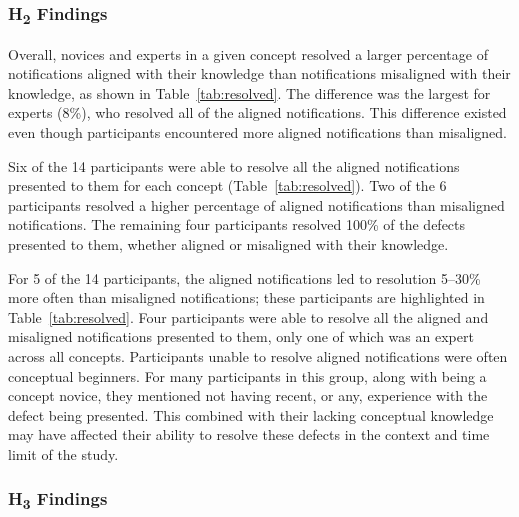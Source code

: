 \subsubsection*{H\textsubscript{2} Findings}

Overall, novices and experts in a given concept resolved a larger percentage of notifications aligned with their knowledge than notifications misaligned with their knowledge, as shown in Table~\ref{tab:resolved}.
The difference was the largest for experts (8\%), who resolved all of the aligned notifications.
This difference existed even though participants encountered more aligned notifications than misaligned.

Six of the 14 participants were able to resolve all the aligned notifications presented to them for each concept (Table~\ref{tab:resolved}). 
Two of the 6 participants resolved a higher percentage of aligned notifications than misaligned notifications.
The remaining four participants resolved 100\% of the defects presented to them, whether aligned or misaligned with their knowledge.

For 5 of the 14 participants, the aligned notifications led to resolution 5--30\% more often than misaligned notifications; these participants are highlighted in Table~\ref{tab:resolved}.
Four participants were able to resolve all the aligned and misaligned notifications presented to them, only one of which was an expert across all concepts.
Participants unable to resolve aligned notifications were often conceptual beginners. 
For many participants in this group, along with being a concept novice, they mentioned not having recent, or any, experience with the defect being presented. This combined with their lacking conceptual knowledge may have affected their ability to resolve these defects in the context and time limit of the study.

\vspace{1em}
\vspace{1em}

\subsubsection*{H\textsubscript{3} Findings}

